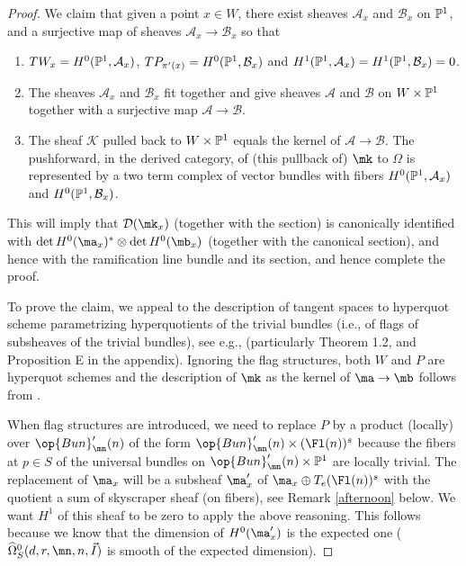 \begin{proof}
We claim that given a point $x\in W$, there exist sheaves $\mathcal{A}_x$ and $\mathcal{B}_x$ on $\Bbb{P}^1$, and a surjective map of sheaves $\mathcal{A}_x\to \mathcal{B}_x$  so that
\begin{enumerate}
\item $TW_x =H^0(\Bbb{P}^1, \mathcal{A}_x)$, $TP_{\pi'(x)}=H^0(\Bbb{P}^1,\mathcal{B}_x)$ and $H^1(\Bbb{P}^1,\mathcal{A}_x)=H^1(\Bbb{P}^1,\mathcal{B}_x)=0$.
\item The sheaves $\mathcal{A}_x$ and $\mathcal{B}_x$ fit together and give sheaves $\mathcal{A}$ and $\mathcal{B}$ on $W\times \Bbb{P}^1$ together with a surjective map $\mathcal{A}\to \mathcal{B}$.
\item The sheaf $\mathcal{K}$ pulled back to $W\times\Bbb{P}^1$ equals the kernel of  $\mathcal{A}\to \mathcal{B}$. The pushforward, in the derived category, of (this pullback of) $\mk$ to $\Omega$
    is represented by a two term complex of vector bundles with fibers $H^0(\Bbb{P}^1, \mathcal{A}_x)$ and $H^0(\Bbb{P}^1,\mathcal{B}_x)$.
\end{enumerate}
This will imply that $\mathcal{D}(\mk_x)$ (together with the section) is canonically identified with $\det H^0(\ma_x)^*\otimes \det H^0(\mb_x)$ (together with the canonical section), and hence with the ramification line bundle and its section, and hence complete the proof.


To prove the claim, we appeal to the description of tangent spaces to hyperquot scheme parametrizing hyperquotients of the trivial bundles (i.e., of flags of subsheaves of the trivial bundles), see e.g., \cite{CF} (particularly Theorem 1.2, and Proposition E in the appendix). Ignoring the flag structures, both $W$ and $P$ are hyperquot schemes and the description of $\mk$ as the kernel of $\ma\to \mb$ follows from \cite[Prop. E]{CF}.

When flag structures are introduced, we need to replace $P$ by a product (locally) over $\op{Bun}'_{\mn}(n)$ of the form $\op{Bun}'_{\mn}(n)\times (\Fl(n))^s$ because the fibers at $p\in S$ of the universal bundles on $\op{Bun}'_{\mn}(n)\times \Bbb{P}^1$ are locally trivial. The replacement of $\ma_x$ will be a subsheaf $\ma'_x$ of $\ma_x\oplus T_e(\Fl(n))^s$ with the quotient a sum of skyscraper sheaf (on fibers), see Remark \ref{afternoon} below. We want $H^1$ of this sheaf to be zero to apply the above reasoning. This follows because we know that the dimension of $H^0(\ma'_x)$ is the expected one ($\widehat{\Omega}^0_S(d,r,\mn,n,\vec{I})$ is smooth of the expected dimension).
\end{proof}
